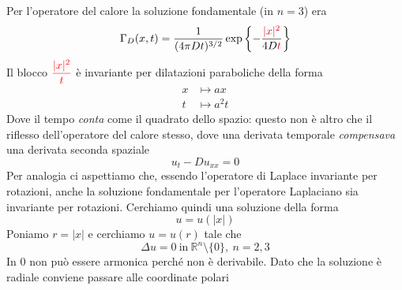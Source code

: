 \documentclass[10pt,a4paper,twoside,openright]{book}
\begin{document}
Per l'operatore del calore la soluzione fondamentale (in $\displaystyle n=3$) era
\begin{equation*}
	\Gamma _{D}(x,t) =\frac{1}{(4\pi Dt)^{3/2}}\exp\left\{-\frac{\textcolor[rgb]{0.82,0.01,0.11}{| }\textcolor[rgb]{0.82,0.01,0.11}{x}\textcolor[rgb]{0.82,0.01,0.11}{| }\textcolor[rgb]{0.82,0.01,0.11}{^{2}}}{4D\textcolor[rgb]{0.82,0.01,0.11}{t}}\right\}
\end{equation*}
Il blocco $\displaystyle \textcolor[rgb]{1,0,0}{\frac{| x| ^{2}}{t}}$ è invariante per dilatazioni paraboliche della forma
\begin{align*}
	x & \longmapsto ax      \\
	t & \longmapsto a^{2} t 
\end{align*}
Dove il tempo \textit{conta} come il quadrato dello spazio: questo non è altro che il riflesso dell'operatore del calore stesso, dove una derivata temporale \textit{compensava} una derivata seconda spaziale	
\begin{equation*}
	u_{t} -Du_{xx} =0
\end{equation*}
Per analogia ci aspettiamo che, essendo l'operatore di Laplace invariante per rotazioni, anche la soluzione fondamentale per l'operatore Laplaciano sia invariante per rotazioni. Cerchiamo quindi una soluzione della forma
\begin{equation*}
	u=u(| x|)
\end{equation*}
Poniamo $\displaystyle r=| x| $ e cerchiamo $\displaystyle u=u(r)$ tale che
\begin{equation*}
	\Delta u=0\ \text{in} \ \mathbb{R}^{n} \setminus \{0\},\ n=2,3
\end{equation*}
In $\displaystyle 0$ non può essere armonica perché non è derivabile. Dato che la soluzione è radiale conviene passare alle coordinate polari
\end{document}
